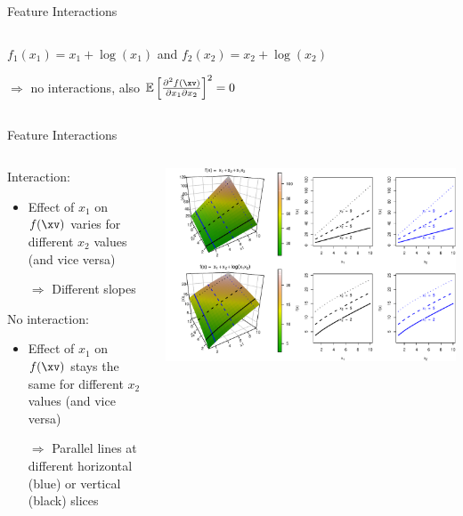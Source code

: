 \documentclass[11pt,compress,t,notes=noshow, aspectratio=169, xcolor=table]{beamer}
\begin{document}
\begin{frame}{Feature Interactions }
\begin{columns}[T, totalwidth=\textwidth]
\begin{column}{0.5\textwidth}
\medskip

$f_1(x_1) = x_1 + \log(x_1)$ and $f_2(x_2) = x_2 + \log(x_2)$

\medskip

$\Rightarrow$ no interactions, also $\mathbb{E} \left[ \tfrac{\partial^2 f(\xv)}{\partial x_1 \partial x_2} \right]^2 = 0$
\end{column} 
\end{columns}

\end{frame}


\begin{frame}{Feature Interactions}

\begin{columns}[c, totalwidth=\textwidth]
\begin{column}{0.3\textwidth}
Interaction:
\begin{itemize}
	\item Effect of $x_1$ on $f(\xv)$ varies for different $x_2$ values (and vice versa)
	\item[$\Rightarrow$] Different slopes
\end{itemize}

\vspace{20pt}

No interaction:
\begin{itemize}
	\item Effect of $x_1$ on $f(\xv)$ stays the same for different $x_2$ values (and vice versa)
	\item[$\Rightarrow$] Parallel lines at different horizontal (blue) or vertical (black) slices
\end{itemize}

\end{column}
\begin{column}{0.7\textwidth}
	\includegraphics[width = \textwidth]{figure/interaction_separable}
\end{column}
\end{columns}

\end{frame}
\end{document}
